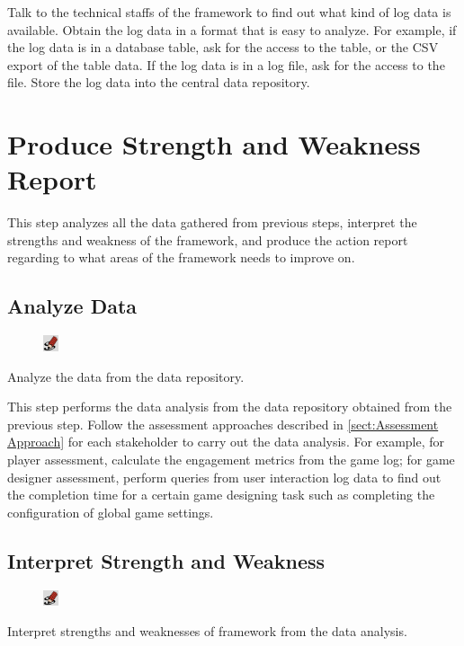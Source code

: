 \documentclass[11pt,oneside]{book}
\begin{document}
Talk to the technical staffs of the framework to find out what kind of log data is available. Obtain the log data in a format that 
is easy to analyze. For example, if the log data is in a database table, ask for the access to the table, or the CSV export of 
the table data. If the log data is in a log file, ask for the access to the file. Store the log data into the central data repository.

\chapter{Produce Strength and Weakness Report}

This step analyzes all the data gathered from previous steps, interpret the strengths and weakness of the framework, 
and produce the action report regarding to what areas of the framework needs to improve on.

\section{Analyze Data}
\begin{shadebox}
\begin{figure}
\vspace{-15pt}\hspace{-10pt}
    \includegraphics[width=0.04\textwidth]{note-icon}
\end{figure}
Analyze the data from the data repository.
\end{shadebox}

This step performs the data analysis from the data repository obtained from the previous step. Follow the assessment approaches described in \autoref{sect:Assessment Approach} for each stakeholder to carry out the data analysis. For example, for player assessment, calculate the 
engagement metrics from the game log; for game designer assessment, perform queries from user interaction log data to find out the completion time for a certain game designing task such as completing the configuration of global game settings. 

\section{Interpret Strength and Weakness}
\begin{shadebox}
\begin{figure}
\vspace{-15pt}\hspace{-10pt}
    \includegraphics[width=0.04\textwidth]{note-icon}
\end{figure}
Interpret strengths and weaknesses of framework from the data analysis.
\end{shadebox}
\end{document}
